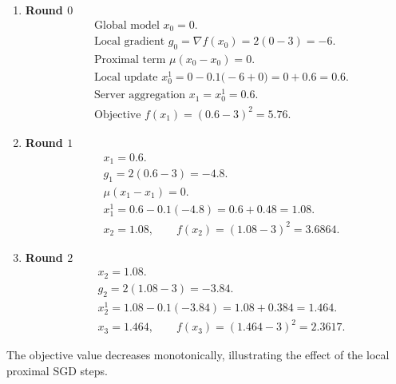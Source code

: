 \documentclass{article}
\begin{document}
\begin{enumerate}[label=\textbf{Round \arabic*:}, leftmargin=*]
\item \textbf{Round $0$}
    \begin{align*}
    &\text{Global model } x_0 = 0.\\
    &\text{Local gradient } g_0 = \nabla f(x_0)=2(0-3)=-6.\\
    &\text{Proximal term } \mu(x_0-x_0)=0.\\
    &\text{Local update } x_{0}^{1}=0-0.1\bigl(-6+0\bigr)=0+0.6=0.6.\\
    &\text{Server aggregation } x_1 = x_{0}^{1}=0.6.\\
    &\text{Objective } f(x_1)=(0.6-3)^2=5.76.
    \end{align*}
\item \textbf{Round $1$}
    \begin{align*}
    &x_1=0.6.\\
    &g_1 = 2(0.6-3) = -4.8.\\
    &\mu(x_1-x_1)=0.\\
    &x_{1}^{1}=0.6-0.1(-4.8)=0.6+0.48=1.08.\\
    &x_2 = 1.08,\qquad f(x_2)=(1.08-3)^2=3.6864.
    \end{align*}
\item \textbf{Round $2$}
    \begin{align*}
    &x_2=1.08.\\
    &g_2 = 2(1.08-3) = -3.84.\\
    &x_{2}^{1}=1.08-0.1(-3.84)=1.08+0.384=1.464.\\
    &x_3 = 1.464,\qquad f(x_3)=(1.464-3)^2=2.3617.
    \end{align*}
\end{enumerate}
The objective value decreases monotonically, illustrating the effect of the local proximal SGD steps.

\newpage
\end{document}
